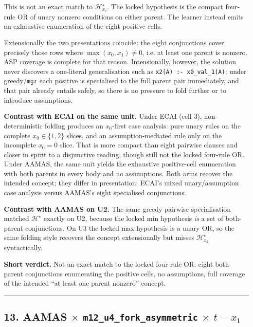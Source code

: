 \documentclass[11pt]{article}
\begin{document}
This is not an exact match to \(\mathcal{H}_{x_2}^\star\). The locked hypothesis is the compact four-rule OR of unary nonzero conditions on either parent. The learner instead emits an exhaustive enumeration of the eight positive cells.

Extensionally the two presentations coincide: the eight conjunctions cover precisely those rows where \(\max(x_0,x_1)\neq 0\), i.e. at least one parent is nonzero. ASP coverage is complete for that reason. Intensionally, however, the solution never discovers a one-literal generalisation such as \texttt{x2(A) :- x0\_val\_1(A)}; under greedy/\texttt{mgr} each positive is specialised to the full parent pair immediately, and that pair already entails safely, so there is no pressure to fold further or to introduce assumptions.

\textbf{Contrast with ECAI on the same unit.} Under ECAI (cell 3), non-deterministic folding produces an \(x_0\)-first case analysis: pure unary rules on the complete \(x_0\in\{1,2\}\) slices, and an assumption-mediated rule only on the incomplete \(x_0=0\) slice. That is more compact than eight pairwise clauses and closer in spirit to a disjunctive reading, though still not the locked four-rule OR. Under AAMAS, the same unit yields the exhaustive positive-cell enumeration with both parents in every body and no assumptions. Both arms recover the intended concept; they differ in presentation: ECAI's mixed unary/assumption case analysis versus AAMAS's eight specialised conjunctions.

\textbf{Contrast with AAMAS on U2.} The same greedy pairwise specialisation matched \(\mathcal{H}^\star\) exactly on U2, because the locked min hypothesis \emph{is} a set of both-parent conjunctions. On U3 the locked max hypothesis is a unary OR, so the same folding style recovers the concept extensionally but misses \(\mathcal{H}_{x_2}^\star\) syntactically.

\textbf{Short verdict.} Not an exact match to the locked four-rule OR: eight both-parent conjunctions enumerating the positive cells, no assumptions, full coverage of the intended ``at least one parent nonzero'' concept.

\medskip\hrule\medskip

\subsection{\texorpdfstring{13. AAMAS \(\times\) \texttt{m12\_u4\_fork\_asymmetric} \(\times\) \(t=x_1\)}{13. AAMAS - m12-u4-fork-asymmetric - target x1}}
\end{document}
